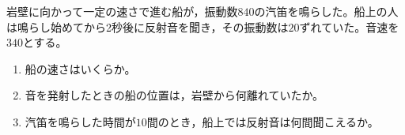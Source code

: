 \hakosyokika
\item 岩壁に向かって一定の速さで進む船が，振動数$840$の汽笛を鳴らした。船上の人は鳴らし始めてから2秒後に反射音を聞き，その振動数は$20$ずれていた。音速を$340$とする。
        \begin{enumerate}
            \item 船の速さはいくらか。
            \item 音を発射したときの船の位置は，岩壁から何離れていたか。
            \item 汽笛を鳴らした時間が$10$間のとき，船上では反射音は何間聞こえるか。
        \end{enumerate}